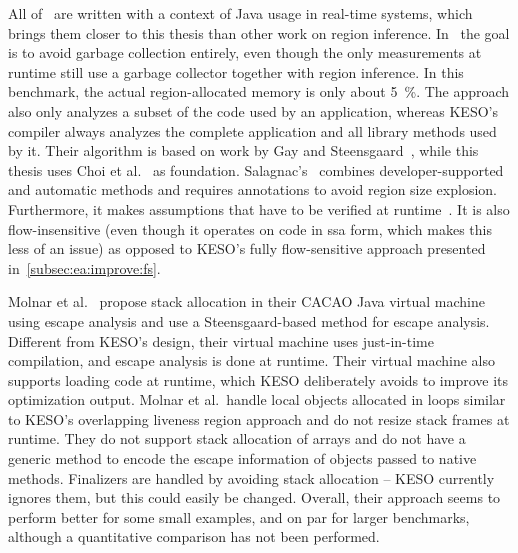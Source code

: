 	All of~\cite{chin:04:pldi, salagnac:05:aiool, salagnac:07:rtcsa} are written with a context of Java usage in real-time
	systems, which brings them closer to this thesis than other work on region inference. In~\cite{salagnac:05:aiool} the
	goal is to avoid garbage collection entirely, even though the only measurements at runtime still use a garbage
	collector together with region inference. In this benchmark, the actual region-allocated memory is only about 5~\%.
	The approach also only analyzes a subset of the code used by an application, whereas KESO's compiler always analyzes
	the complete application and all library methods used by it. Their algorithm is based on work by Gay and
	Steensgaard~\cite{gay:00:cc}, while this thesis uses Choi et al.~\cite{choi:03:toplas} as foundation.
	Salagnac's~\cite{salagnac:07:rtcsa} combines developer-supported and automatic methods and requires annotations to
	avoid region size explosion. Furthermore, it makes assumptions that have to be verified at
	runtime~\cite[Sec.~3.1]{salagnac:07:rtcsa}. It is also flow-insensitive (even though it operates on code in \gls{ssa}
	form, which makes this less of an issue) as opposed to KESO's fully flow-sensitive approach presented
	in~\cref{subsec:ea:improve:fs}.

	Molnar et al.~\cite{molnar:09:pppj} propose stack allocation in their CACAO Java virtual machine using escape analysis
	and use a Steensgaard-based method for escape analysis. Different from KESO's design, their virtual machine uses
	just-in-time compilation, and escape analysis is done at runtime. Their virtual machine also supports loading code at
	runtime, which KESO deliberately avoids to improve its optimization output. Molnar et al.\ handle local objects
	allocated in loops similar to KESO's overlapping liveness region approach and do not resize stack frames at runtime.
	They do not support stack allocation of arrays and do not have a generic method to encode the escape information of
	objects passed to native methods. Finalizers are handled by avoiding stack allocation – KESO currently ignores them,
	but this could easily be changed. Overall, their approach seems to perform better for some small examples, and on par
	for larger benchmarks, although a quantitative comparison has not been performed.
